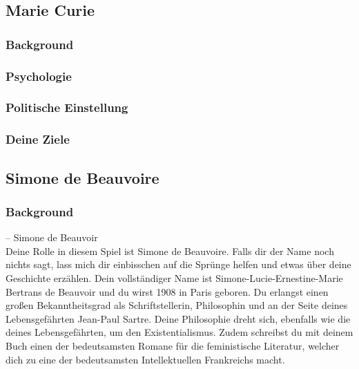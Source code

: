 \documentclass[12pt, a4paper, openany]{report}
\begin{document}
\subsection{Marie Curie}
\subsubsection{Background}

\subsubsection{Psychologie}
\subsubsection{Politische Einstellung}
\subsubsection{Deine Ziele}

\subsection{Simone de Beauvoire}
 
\subsubsection{Background}


– Simone de Beauvoir\\


Deine Rolle in diesem Spiel ist Simone de Beauvoire. Falls dir der Name noch nichts sagt, lass mich dir einbisschen auf die Sprünge helfen und etwas über deine Geschichte erzählen. 
Dein vollständiger Name ist Simone-Lucie-Ernestine-Marie Bertrans de Beauvoir und du wirst 1908 in Paris geboren. Du erlangst einen großen Bekanntheitsgrad als Schriftstellerin, Philosophin und an der Seite deines Lebensgefährten Jean-Paul Sartre. Deine Philosophie dreht sich, ebenfalls wie die deines Lebensgefährten, um den Existentialismus. Zudem schreibst du mit deinem Buch  einen der bedeutsamsten Romane für die feministische Literatur, welcher dich zu eine der bedeutsamsten Intellektuellen Frankreichs macht. \\
\end{document}
